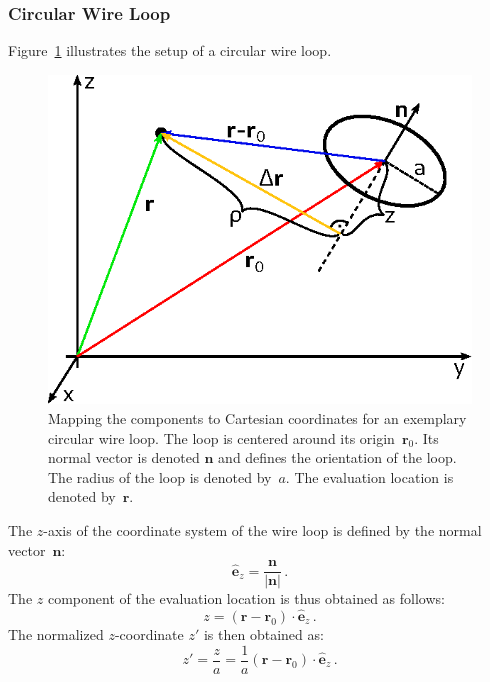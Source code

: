 \subsubsection{Circular Wire Loop}
Figure~\ref{fig:CircularWireLoop_MappingToCartesian} illustrates the setup of a circular wire loop.
\begin{figure}[htbp]
 \centering
 \includegraphics{img/CircularWireLoop_MappingToCartesian.eps}
 \caption{Mapping the components to Cartesian coordinates for an exemplary circular wire loop.
          The loop is centered around its origin~$\mathbf{r}_0$.
          Its normal vector is denoted $\mathbf{n}$ and defines the orientation of the loop.
          The radius of the loop is denoted by~$a$.
          The evaluation location is denoted by~$\mathbf{r}$.}
 \label{fig:CircularWireLoop_MappingToCartesian}
\end{figure}
The $z$-axis of the coordinate system of the wire loop is defined by the normal vector~$\mathbf{n}$:
\begin{equation}
  \hat{\mathbf{e}}_z = \frac{\mathbf{n}}{|\mathbf{n}|} \, .
\end{equation}
The $z$ component of the evaluation location is thus obtained as follows:
\begin{equation}
  z = (\mathbf{r} - \mathbf{r}_0) \cdot \hat{\mathbf{e}}_z \, .
\end{equation}
The normalized $z$-coordinate $z'$ is then obtained as:
\begin{equation}
  z' = \frac{z}{a} = \frac{1}{a} (\mathbf{r} - \mathbf{r}_0) \cdot \hat{\mathbf{e}}_z \, .
\end{equation}
